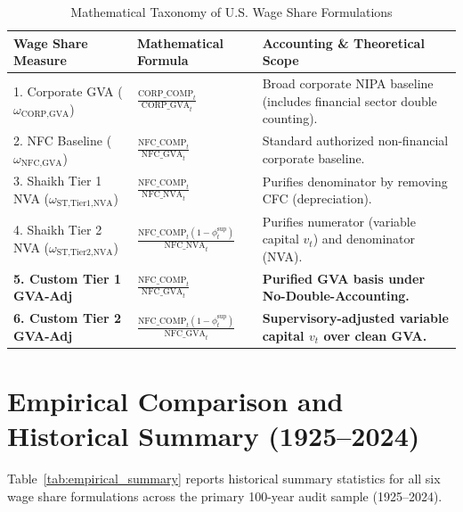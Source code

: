 \documentclass[11pt,a4paper]{article}
\begin{document}
\begin{table}[h!]
\centering
\small
\caption{Mathematical Taxonomy of U.S. Wage Share Formulations}
\label{tab:taxonomy}
\begin{tabular}{p{4.2cm} p{4.6cm} p{6.0cm}}
\toprule
\textbf{Wage Share Measure} & \textbf{Mathematical Formula} & \textbf{Accounting \& Theoretical Scope} \\
\midrule
1. Corporate GVA ($\omega_{\text{CORP,GVA}}$) & $\frac{\text{CORP\_COMP}_t}{\text{CORP\_GVA}_t}$ & Broad corporate NIPA baseline (includes financial sector double counting). \\
2. NFC Baseline ($\omega_{\text{NFC,GVA}}$) & $\frac{\text{NFC\_COMP}_t}{\text{NFC\_GVA}_t}$ & Standard authorized non-financial corporate baseline. \\
3. Shaikh Tier 1 NVA ($\omega_{\text{ST,Tier1,NVA}}$) & $\frac{\text{NFC\_COMP}_t}{\text{NFC\_NVA}_t}$ & Purifies denominator by removing CFC (depreciation). \\
4. Shaikh Tier 2 NVA ($\omega_{\text{ST,Tier2,NVA}}$) & $\frac{\text{NFC\_COMP}_t (1 - \phi_t^{\text{sup}})}{\text{NFC\_NVA}_t}$ & Purifies numerator (variable capital $v_t$) and denominator (NVA). \\
\textbf{5. Custom Tier 1 GVA-Adj} & $\frac{\text{NFC\_COMP}_t}{\text{NFC\_GVA}_t}$ & \textbf{Purified GVA basis under No-Double-Accounting.} \\
\textbf{6. Custom Tier 2 GVA-Adj} & $\frac{\text{NFC\_COMP}_t (1 - \phi_t^{\text{sup}})}{\text{NFC\_GVA}_t}$ & \textbf{Supervisory-adjusted variable capital $v_t$ over clean GVA.} \\
\bottomrule
\end{tabular}
\end{table}

\FloatBarrier
\section{Empirical Comparison and Historical Summary (1925--2024)}

Table~\ref{tab:empirical_summary} reports historical summary statistics for all six wage share formulations across the primary 100-year audit sample (1925--2024).
\end{document}
